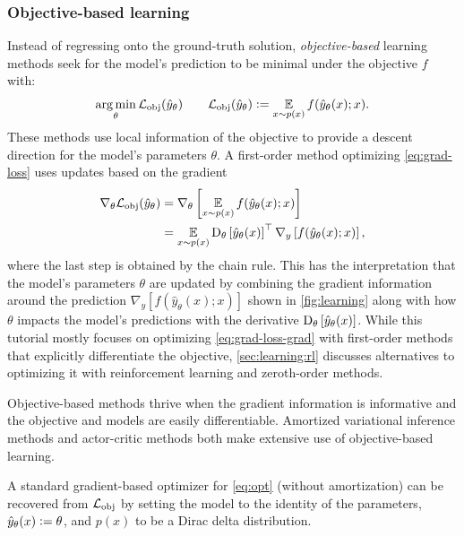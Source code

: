 \subsubsection{Objective-based learning}
\label{sec:learning:grad}

Instead of regressing onto the ground-truth solution,
\emph{objective-based} learning methods seek for
the model's prediction to be minimal under the objective $f$ with:
\begin{equation}
  \operatorname*{arg\,min}_\theta {\mathcal{L}}_{\rm obj}(\hat y_\theta) \qquad {\mathcal{L}}_{\rm obj}(\hat y_\theta) \vcentcolon= \operatorname*{\mathbb{E}}_{x \sim p(x)} f(\hat y_\theta(x); x).
\label{eq:grad-loss}
\end{equation}
These methods use local information of the objective
to provide a descent direction for the model's
parameters $\theta$.
A first-order method optimizing \cref{eq:grad-loss} uses
updates based on the gradient
\begin{equation}
  \begin{aligned}
  \nabla_\theta {\mathcal{L}}_{\rm obj}(\hat y_\theta) &= \nabla_\theta \left[ \operatorname*{\mathbb{E}}_{x\sim p(x)}f(\hat y_\theta(x); x)\right] \\
  &= \operatorname*{\mathbb{E}}_{x\sim p(x)} \mathrm{D}_\theta\left[ \hat y_\theta(x)\right]^\top
  \nabla_{y} \left[ f(\hat y_\theta(x); x) \right],
  \end{aligned}
  \label{eq:grad-loss-grad}
\end{equation}
where the last step is obtained by the chain rule.
This has the interpretation that the model's parameters $\theta$
are updated by combining the gradient information around the prediction
$\nabla_{y} \left[ f(\hat y_\theta(x); x) \right]$
shown in \cref{fig:learning} along with
how $\theta$ impacts the model's predictions with the derivative
$\mathrm{D}_\theta\left[ \hat y_\theta(x)\right]$.
While this tutorial mostly focuses on optimizing
\cref{eq:grad-loss-grad} with
first-order methods that explicitly differentiate
the objective, \cref{sec:learning:rl} discusses alternatives
to optimizing it with reinforcement learning and
zeroth-order methods.

Objective-based methods thrive when the gradient information
is informative and the objective and models are easily differentiable.
Amortized variational inference methods and
actor-critic methods both make extensive use of
objective-based learning.

\begin{remark}
  A standard gradient-based optimizer for \cref{eq:opt} (without amortization)
  can be recovered from ${\mathcal{L}}_{\rm obj}$ by setting the model to the identity
  of the parameters, \ie $\hat y_\theta(x)\vcentcolon=\theta$, and $p(x)$ to be a
  Dirac delta distribution.
  \label{remark:obj-loss}
\end{remark}

